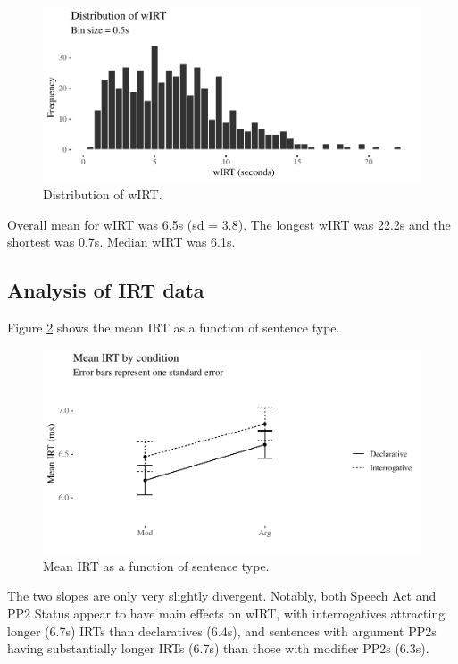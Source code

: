 \documentclass[12pt,oneside]{book}
\begin{document}
\begin{figure}
\centering
\includegraphics{4-results_files/figure-latex/wIRT-1.pdf}
\caption{\label{fig:wIRT}Distribution of wIRT.}
\end{figure}

Overall mean for wIRT was 6.5s (sd = 3.8). The longest wIRT was 22.2s and the shortest was 0.7s. Median wIRT was 6.1s.

\hypertarget{irtRes}{%
\subsection{Analysis of IRT data}\label{irtRes}}

Figure \ref{fig:interactionplot} shows the mean IRT as a function of sentence type.

\begin{figure}
\centering
\includegraphics{4-results_files/figure-latex/interactionplot-1.pdf}
\caption{\label{fig:interactionplot}Mean IRT as a function of sentence type.}
\end{figure}

The two slopes are only very slightly divergent. Notably, both Speech Act and PP2 Status appear to have main effects on wIRT, with interrogatives attracting longer (6.7s) IRTs than declaratives (6.4s), and sentences with argument PP2s having substantially longer IRTs (6.7s) than those with modifier PP2s (6.3s).
\end{document}
